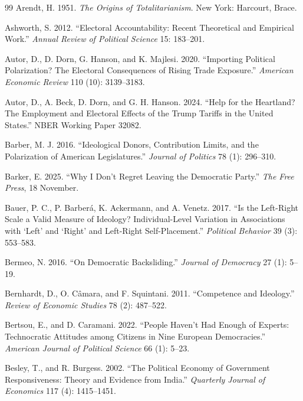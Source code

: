 \documentclass[12pt,letterpaper]{article}
\begin{document}
\begin{thebibliography}{99}
Arendt, H. 1951. \textit{The Origins of Totalitarianism}. New York: Harcourt, Brace.

Ashworth, S. 2012. ``Electoral Accountability: Recent Theoretical and Empirical Work.'' \textit{Annual Review of Political Science} 15: 183--201.

Autor, D., D. Dorn, G. Hanson, and K. Majlesi. 2020. ``Importing Political Polarization? The Electoral Consequences of Rising Trade Exposure.'' \textit{American Economic Review} 110 (10): 3139--3183.

Autor, D., A. Beck, D. Dorn, and G. H. Hanson. 2024. ``Help for the Heartland? The Employment and Electoral Effects of the Trump Tariffs in the United States.'' NBER Working Paper 32082.

Barber, M. J. 2016. ``Ideological Donors, Contribution Limits, and the Polarization of American Legislatures.'' \textit{Journal of Politics} 78 (1): 296--310.

Barker, E. 2025. ``Why I Don't Regret Leaving the Democratic Party.'' \textit{The Free Press}, 18 November.

Bauer, P. C., P. Barber\'{a}, K. Ackermann, and A. Venetz. 2017. ``Is the Left-Right Scale a Valid Measure of Ideology? Individual-Level Variation in Associations with `Left' and `Right' and Left-Right Self-Placement.'' \textit{Political Behavior} 39 (3): 553--583.

Bermeo, N. 2016. ``On Democratic Backsliding.'' \textit{Journal of Democracy} 27 (1): 5--19.

Bernhardt, D., O. C\^{a}mara, and F. Squintani. 2011. ``Competence and Ideology.'' \textit{Review of Economic Studies} 78 (2): 487--522.

Bertsou, E., and D. Caramani. 2022. ``People Haven't Had Enough of Experts: Technocratic Attitudes among Citizens in Nine European Democracies.'' \textit{American Journal of Political Science} 66 (1): 5--23.

Besley, T., and R. Burgess. 2002. ``The Political Economy of Government Responsiveness: Theory and Evidence from India.'' \textit{Quarterly Journal of Economics} 117 (4): 1415--1451.


\end{thebibliography}
\end{document}
